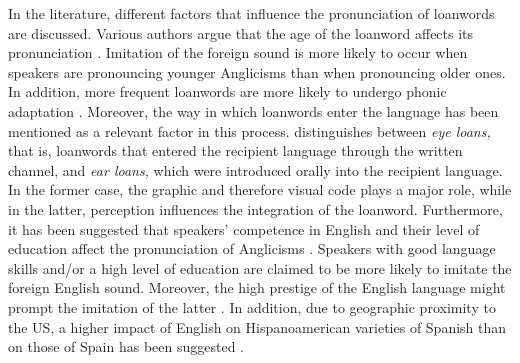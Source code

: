 \documentclass[output=paper]{langscibook}
\begin{document}
In the literature, different factors that influence the pronunciation of loanwords are discussed. Various authors argue that the age of the loanword affects its pronunciation 
\citetext{\citealp[127]{RodriguezGonzalez2017}; \citealp[42]{Haspelmath2009}; \citealp[16]{GomezCapuz2001}; \citealp[216]{Haugen1950}}. Imitation of the foreign sound is more likely to occur when speakers are pronouncing younger Anglicisms than when pronouncing older ones. In addition, more frequent loanwords are more likely to undergo phonic adaptation \citep[354]{RodriguezGonzalez2018}. Moreover, the way in which loanwords enter the language has been mentioned as a relevant factor in this process. \citet[16]{Pratt1980} distinguishes between \textit{eye loans,} that is, loanwords that entered the recipient language through the written channel, and \textit{ear loans,} which were introduced orally into the recipient language. In the former case, the graphic and therefore visual code plays a major role, while in the latter, perception influences the integration of the loanword. Furthermore, it has been suggested that speakers' competence in English and their level of education affect the pronunciation of Anglicisms
\citetext{\citealp[102, 123, 127]{RodriguezGonzalez2017}; \citealp[42]{GomezCapuz2001}}. Speakers with good language skills and/or a high level of education are claimed to be more likely to imitate the foreign English sound. Moreover, the high prestige of the English language might prompt the imitation of the latter 
\citetext{\citealp[508]{Pustka2021}; \citealp[42]{GomezCapuz2001}; \citealp[51]{Meisenburg1992}}. In addition, due to geographic proximity to the US, a higher impact of English on Hispanoamerican varieties of Spanish than on those of Spain has been suggested
\citetext{\citealp[504]{Pustka2021}; \citealp[127]{RodriguezGonzalez2017}; \citealp[116]{Oncins-Martinez2009}}. 
\end{document}
